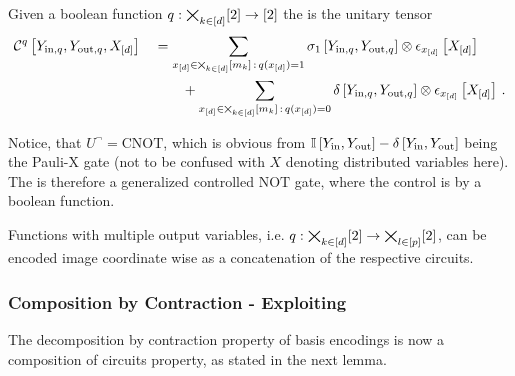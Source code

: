 \begin{definition}[\ComputationCircuit{}]
    Given a boolean function $q:\bigtimes_{k\in[d]}[2]\rightarrow[2]$ the \computationCircuit{} is the unitary tensor
    \begin{align*}
        \qcbencodingofat{\exfunction}{\headvariableof{\insymbol,\exfunction},\headvariableof{\outsymbol,\exfunction},\shortcatvariables}
        &\quad=
        \sum_{\shortcatindicesin\wcols\exfunctionat{\shortcatindices}=1}
        \paulixat{\headvariableof{\insymbol,\exfunction},\headvariableof{\outsymbol,\exfunction}} \otimes
        \onehotmapofat{\shortcatindices}{\shortcatvariables} \\ %
        & \quad \quad \quad +
        \sum_{\shortcatindicesin\wcols\exfunctionat{\shortcatindices}=0}
        \identityat{\headvariableof{\insymbol,\exfunction},\headvariableof{\outsymbol,\exfunction}} \otimes
        \onehotmapofat{\shortcatindices}{\shortcatvariables} \, . %
    \end{align*}
\end{definition}

Notice, that $U^{\lnot} = \mathrm{CNOT}$, which is obvious from $\mathbb{I}\left[Y_{\mathrm{in}},Y_{\mathrm{out}}\right] - \delta\left[Y_{\mathrm{in}},Y_{\mathrm{out}}\right]$ being the Pauli-X gate (not to be confused with $X$ denoting distributed variables here).
The \computationCircuit{} is therefore a generalized controlled $\mathrm{NOT}$ gate, where the control is by a boolean function.

Functions with multiple output variables, i.e. $q:\bigtimes_{k\in[d]}[2]\rightarrow\bigtimes_{l\in[p]}[2]$, can be encoded image coordinate wise as a concatenation of the respective circuits.

\subsubsection{Composition by Contraction - Exploiting \DecompositionSparsity{}}

The decomposition by contraction property of basis encodings is now a composition of circuits property, as stated in the next lemma.

